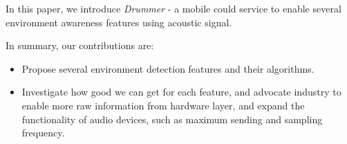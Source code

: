 In this paper, we introduce {\em Drummer} - a mobile could service to enable several environment awareness 
features using acoustic signal. 



In summary, our contributions are:

\begin{itemize}

\item Propose several environment detection features and their algorithms.

\item Investigate how good we can get for each feature, and advocate industry to enable more raw information
from hardware layer, and expand the functionality of audio devices, such as maximum sending and sampling frequency.
\end{itemize}












